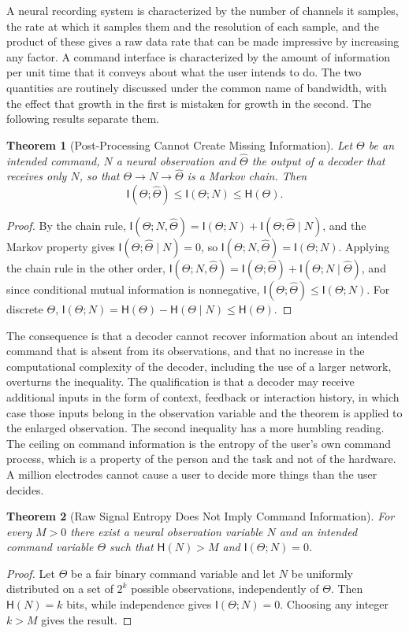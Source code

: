 \documentclass[11pt,twoside,openany]{book}
\newtheorem{theorem}{Theorem}[chapter]
\theoremstyle{definition}
\theoremstyle{remark}
\newcommand{\MI}{\mathsf{I}}
\newcommand{\Hent}{\mathsf{H}}
\newcommand{\Th}{\Theta}
\newcommand{\Thh}{\widehat{\Theta}}
\begin{document}
A neural recording system is characterized by the number of channels it samples, the rate at which it samples them and the resolution of each sample, and the product of these gives a raw data rate that can be made impressive by increasing any factor. A command interface is characterized by the amount of information per unit time that it conveys about what the user intends to do. The two quantities are routinely discussed under the common name of bandwidth, with the effect that growth in the first is mistaken for growth in the second. The following results separate them.

\begin{theorem}[Post-Processing Cannot Create Missing Information]\label{thm:dpi}
Let $\Th$ be an intended command, $N$ a neural observation and $\Thh$ the output of a decoder that receives only $N$, so that $\Th\to N\to\Thh$ is a Markov chain. Then
\[
\MI(\Th;\Thh)\le\MI(\Th;N)\le\Hent(\Th).
\]
\end{theorem}
\begin{proof}
By the chain rule, $\MI(\Th;N,\Thh)=\MI(\Th;N)+\MI(\Th;\Thh\mid N)$, and the Markov property gives $\MI(\Th;\Thh\mid N)=0$, so $\MI(\Th;N,\Thh)=\MI(\Th;N)$. Applying the chain rule in the other order, $\MI(\Th;N,\Thh)=\MI(\Th;\Thh)+\MI(\Th;N\mid\Thh)$, and since conditional mutual information is nonnegative, $\MI(\Th;\Thh)\le\MI(\Th;N)$. For discrete $\Th$, $\MI(\Th;N)=\Hent(\Th)-\Hent(\Th\mid N)\le\Hent(\Th)$.
\end{proof}

The consequence is that a decoder cannot recover information about an intended command that is absent from its observations, and that no increase in the computational complexity of the decoder, including the use of a larger network, overturns the inequality. The qualification is that a decoder may receive additional inputs in the form of context, feedback or interaction history, in which case those inputs belong in the observation variable and the theorem is applied to the enlarged observation. The second inequality has a more humbling reading. The ceiling on command information is the entropy of the user's own command process, which is a property of the person and the task and not of the hardware. A million electrodes cannot cause a user to decide more things than the user decides.

\begin{theorem}[Raw Signal Entropy Does Not Imply Command Information]\label{thm:bandwidth}
For every $M>0$ there exist a neural observation variable $N$ and an intended command variable $\Th$ such that $\Hent(N)>M$ and $\MI(\Th;N)=0$.
\end{theorem}
\begin{proof}
Let $\Th$ be a fair binary command variable and let $N$ be uniformly distributed on a set of $2^k$ possible observations, independently of $\Th$. Then $\Hent(N)=k$ bits, while independence gives $\MI(\Th;N)=0$. Choosing any integer $k>M$ gives the result.
\end{proof}
\end{document}
